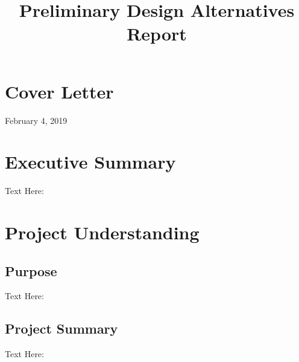 \documentclass{ceri}
\title{Preliminary Design Alternatives Report}
\begin{document}
 
\maketitle
\sloppy     
{}
\section{Cover Letter}
\setlength{\parindent}{0pt}
February 4, 2019
\newline

\newpage
\setlength{\parindent}{8pt}
\section{Executive Summary}
Text Here:

\section{Project Understanding}

\subsection{Purpose}
Text Here:

\subsection{Project Summary}
Text Here:

\newpage
\end{document}
